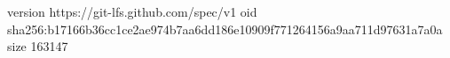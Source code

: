 version https://git-lfs.github.com/spec/v1
oid sha256:b17166b36cc1ce2ae974b7aa6dd186e10909f771264156a9aa711d97631a7a0a
size 163147
